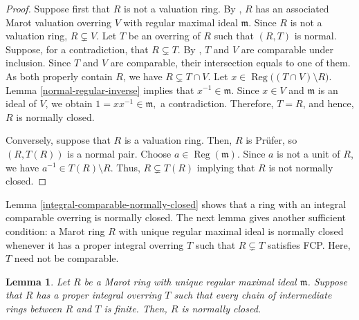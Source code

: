 \documentclass[12pt]{article}
\newtheorem{lemma}{Lemma}
\newcommand{\Reg}{\operatorname{Reg}}
\begin{document}
	\begin{proof}
		Suppose first that $R$ is not a valuation ring. By \cite[Theorem 2.16]{marot}, $R$ has an associated Marot valuation overring $V$ with regular maximal ideal $\mathfrak m$. Since $R$ is not a valuation ring, $R\subsetneq V$. Let $T$ be an overring of $R$ such that $(R,T)$ is normal. Suppose, for a contradiction, that $R\subsetneq T$. By \cite[Theorem 3.1]{marot}, $T$ and $V$ are comparable under inclusion. Since $T$ and $V$ are comparable, their intersection equals to one of them. As both properly contain $R$, we have $R\subsetneq T\cap V$. Let $x\in\Reg\bigl((T\cap V)\setminus R\bigr).$ Lemma \ref{normal-regular-inverse} implies that $x^{-1}\in\mathfrak m$. Since $x\in V$ and $\mathfrak m$ is an ideal of $V$, we obtain $1=xx^{-1}\in\mathfrak m,$ a contradiction. Therefore, $T=R$, and hence, $R$ is normally closed.
		
		Conversely, suppose that $R$ is a valuation ring. Then, $R$ is Prüfer, so $(R,T(R))$ is a normal pair. Choose $a\in\Reg(\mathfrak m)$. Since $a$ is not a unit of $R$, we have $a^{-1}\in T(R)\setminus R$. Thus, $R\subsetneq T(R)$ implying that $R$ is not normally closed.
	\end{proof}
	
	Lemma \ref{integral-comparable-normally-closed} shows that a ring with an integral comparable overring is normally closed. The next lemma gives another sufficient condition: a Marot ring $R$ with unique regular maximal ideal is normally closed whenever it has a proper integral overring $T$ such that $R\subsetneq T$ satisfies FCP. Here, $T$ need not be comparable.

	\begin{lemma}\label{fc-integral-normally-closed}
		Let $R$ be a Marot ring with unique regular maximal ideal $\mathfrak{m}$. Suppose that $R$ has a proper integral overring $T$ such that every chain of intermediate rings between $R$ and $T$ is finite. Then, $R$ is normally closed.
	\end{lemma}
	
\end{document}

